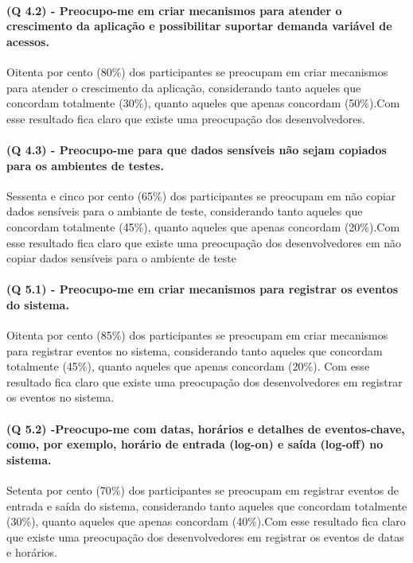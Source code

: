 \paragraph{\textbf{(Q 4.2)} - Preocupo-me em criar mecanismos para atender o crescimento da aplicação e possibilitar suportar demanda variável de acessos.}

Oitenta por cento (80{\%}) dos participantes se preocupam em criar mecanismos para atender o crescimento da aplicação, considerando tanto aqueles que concordam totalmente (30{\%}), quanto aqueles que apenas concordam (50{\%}).Com esse resultado fica claro que existe uma preocupação dos desenvolvedores.

\paragraph{\textbf{(Q 4.3)} - Preocupo-me para que dados sensíveis não sejam copiados para os ambientes de testes.}

Sessenta e cinco por cento (65{\%}) dos participantes se preocupam em não copiar dados sensíveis para o ambiante de teste, considerando tanto aqueles que concordam totalmente (45{\%}), quanto aqueles que apenas concordam (20{\%}).Com esse resultado fica claro que existe uma preocupação dos desenvolvedores em não copiar dados sensíveis para o ambiente de teste 
 
\paragraph{\textbf{(Q 5.1)} - Preocupo-me em criar mecanismos para registrar os eventos do sistema.}

Oitenta por cento (85{\%}) dos participantes se preocupam em criar mecanismos para registrar eventos no sistema, considerando tanto aqueles que concordam totalmente (45{\%}), quanto aqueles que apenas concordam (20{\%}). Com esse resultado fica claro que existe uma preocupação dos desenvolvedores em registrar os eventos no sistema.

\paragraph{\textbf{(Q 5.2)} -Preocupo-me com datas, horários e detalhes de eventos-chave, como, por exemplo, horário de entrada (log-on) e saída (log-off) no sistema.}

Setenta por cento (70{\%}) dos participantes se preocupam em registrar eventos de entrada e saída do sistema, considerando tanto aqueles que concordam totalmente (30{\%}), quanto aqueles que apenas concordam (40{\%}).Com esse resultado fica claro que existe uma preocupação dos desenvolvedores em registrar os eventos de datas e horários.

